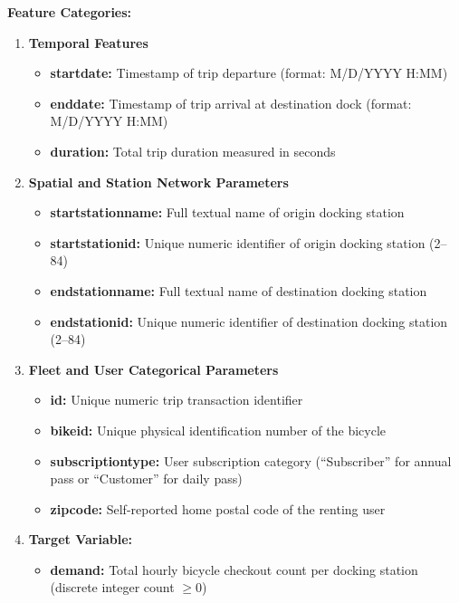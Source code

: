 \documentclass[12pt, a4paper]{article}
\renewcommand{\_}{\textunderscore\allowbreak}
\begin{document}
\vspace{0.2cm}
\noindent \textbf{Feature Categories:}
\begin{enumerate}
    \item \textbf{Temporal Features}
    \begin{itemize}
        \item \textbf{start\_date:} Timestamp of trip departure (format: M/D/YYYY H:MM)
        \item \textbf{end\_date:} Timestamp of trip arrival at destination dock (format: M/D/YYYY H:MM)
        \item \textbf{duration:} Total trip duration measured in seconds
    \end{itemize}

    \item \textbf{Spatial and Station Network Parameters}
    \begin{itemize}
        \item \textbf{start\_station\_name:} Full textual name of origin docking station
        \item \textbf{start\_station\_id:} Unique numeric identifier of origin docking station (2--84)
        \item \textbf{end\_station\_name:} Full textual name of destination docking station
        \item \textbf{end\_station\_id:} Unique numeric identifier of destination docking station (2--84)
    \end{itemize}

    \item \textbf{Fleet and User Categorical Parameters}
    \begin{itemize}
        \item \textbf{id:} Unique numeric trip transaction identifier
        \item \textbf{bike\_id:} Unique physical identification number of the bicycle
        \item \textbf{subscription\_type:} User subscription category (``Subscriber'' for annual pass or ``Customer'' for daily pass)
        \item \textbf{zip\_code:} Self-reported home postal code of the renting user
    \end{itemize}

    \item \textbf{Target Variable:}
    \begin{itemize}
        \item \textbf{demand:} Total hourly bicycle checkout count per docking station (discrete integer count $\ge 0$)
    \end{itemize}
\end{enumerate}
\end{document}
